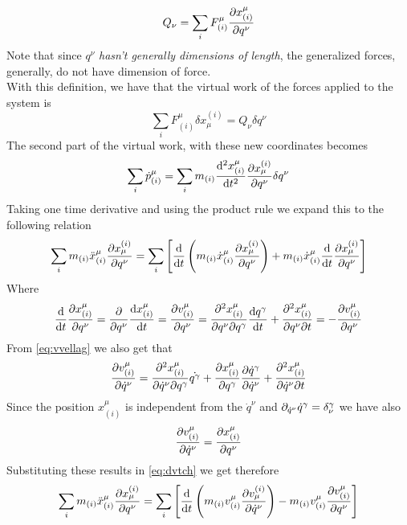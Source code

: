 \documentclass[../admech.tex]{subfiles}
\begin{document}
\begin{equation}
	Q_\nu=\sum_iF^\mu_{(i)}\pdv{x^\mu_{(i)}}{q^\nu}
	\label{eq:genforce}
\end{equation}
Note that since $q^\nu$ \emph{hasn't generally dimensions of length}, the generalized forces, generally, do not have dimension of force.\\
With this definition, we have that the virtual work of the forces applied to the system is
\begin{equation}
	\sum_iF^\mu_{(i)}\delta x^{(i)}_\mu=Q_\nu\delta q^\nu
	\label{eq:vworkgenco}
\end{equation}
The second part of the virtual work, with these new coordinates becomes
\begin{equation*}
	\sum_{i}\dot{p}^\mu_{(i)}=\sum_im_{(i)}\dv[2]{x^\mu_{(i)}}{t}\pdv{x_\mu^{(i)}}{q^\nu}\delta q^\nu
\end{equation*}
Taking one time derivative and using the product rule we expand this to the following relation
\begin{equation}
	\sum_{i}m_{(i)}\ddot{x}^{\mu}_{(i)}\pdv{x_\mu^{(i)}}{q^\nu}=\sum_i\left[ \dv{t}\left( m_{(i)}\dot{x}^\mu_{(i)}\pdv{x_\mu^{(i)}}{q^\nu} \right)+m_{(i)}\dot{x}^\mu_{(i)}\dv{t}\pdv{x_\mu^{(i)}}{q^\nu} \right]
	\label{eq:dvtch}
\end{equation}
Where
\begin{equation*}
	\dv{t}\pdv{x^\mu_{(i)}}{q^\nu}=\pdv{q^\nu}\dv{x^\mu_{(i)}}{t}=\pdv{v^\mu_{(i)}}{q^\nu}=\pdv[2]{x^\mu_{(i)}}{q^\nu}{q^\gamma}\dv{q^\gamma}{t}+\pdv[2]{x^\mu_{(i)}}{q^\nu}{t}=-\pdv{v^\mu_{(i)}}{q^\nu}
\end{equation*}
From \eqref{eq:vvellag} we also get that
\begin{equation*}
	\pdv{v^\mu_{(i)}}{\dot{q}^\nu}=\pdv[2]{x^\mu_{(i)}}{\dot{q}^\nu}{q^\gamma}\dot{q^\gamma}+\pdv{x^\mu_{(i)}}{q^\gamma}\pdv{\dot{q}^\gamma}{\dot{q}^\nu}+\pdv[2]{x^\mu_{(i)}}{\dot{q}^{\nu}}{t}
\end{equation*}
Since the position $x^\mu_{(i)}$ is independent from the $\dot{q}^\nu$ and $\partial_{\dot{q}^\nu}\dot{q}^\gamma=\delta^\gamma_\nu$ we have also
\begin{equation}
	\pdv{v^\mu_{(i)}}{\dot{q}^\nu}=\pdv{x^\mu_{(i)}}{q^\nu}
	\label{eq:pdvdotx}
\end{equation}
Substituting these results in \eqref{eq:dvtch} we get therefore
\begin{equation}
	\sum_im_{(i)}\ddot{x}^\mu_{(i)}\pdv{x_\mu^{(i)}}{q^\nu}=\sum_i\left[ \dv{t}\left( m_{(i)}v^\mu_{(i)}\pdv{v_\mu^{(i)}}{\dot{q}^\nu}\right)-m_{(i)}v^\mu_{(i)}\pdv{v^\mu_{(i)}}{q^\nu} \right]
	\label{eq:dvtch2}
\end{equation}
\end{document}
